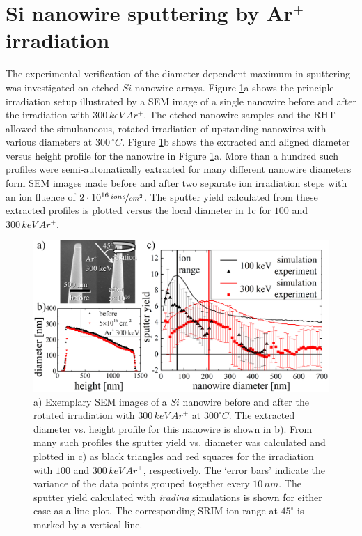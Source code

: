 \section{Si nanowire sputtering by Ar$^+$ irradiation}
\label{sec:sisputtering}

The experimental verification of the diameter-dependent maximum in sputtering was investigated on etched $Si$-nanowire arrays. Figure \ref{sputtering_exp}a shows the principle irradiation setup illustrated by a SEM image of a single nanowire before and after the irradiation with $300\,keV\,Ar^+$. The etched nanowire samples and the RHT allowed the simultaneous, rotated irradiation of upstanding nanowires with various diameters at $300\,^\circ C$. Figure \ref{sputtering_exp}b shows the extracted and aligned diameter versus height profile for the nanowire in Figure \ref{sputtering_exp}a. More than a hundred such profiles were semi-automatically extracted for many different nanowire diameters form SEM images made before and after two separate ion irradiation steps with an ion fluence of $2\cdot10^{16}\,\nicefrac{ions}{cm^2}$. The sputter yield calculated from these extracted profiles is plotted versus the local diameter in \ref{sputtering_exp}c for $100$ and $300\,keV\,Ar^+$.

\begin{figure}[th]
	\centering
		\includegraphics[width=.95\textwidth]{images/sputter_exp.png}
	\caption{a) Exemplary SEM images of a $Si$ nanowire before and after the rotated irradiation with $300\,keV\,Ar^+$ at $300^\circ C$. The extracted diameter vs. height profile for this nanowire is shown in b). From many such profiles the sputter yield vs. diameter was calculated and plotted in c) as black triangles and red squares for the irradiation with $100$ and $300\,keV\,Ar^+$, respectively. The `error bars' indicate the variance of the data points grouped together every $10\,nm$. The sputter yield calculated with \emph{iradina} simulations is shown for either case as a line-plot. The corresponding SRIM ion range at $45^\circ$ is marked by a vertical line.} 
	\label{sputtering_exp}
\end{figure} 

